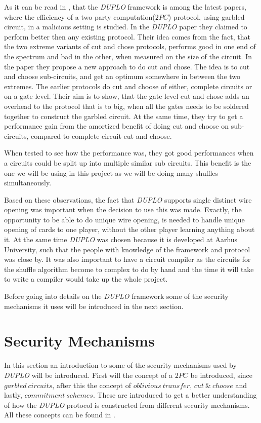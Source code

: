 \documentclass[twoside,11pt,openright]{report}
\newcommand{\DUPLO}{\textit{DUPLO} }
\begin{document}
As it can be read in \cite{duplo}, that the \DUPLO framework is among the latest papers, where the efficiency of a two party computation($2PC$) protocol, using garbled circuit, in a malicious setting is studied. In the \DUPLO paper they claimed to perform better then any existing protocol. Their idea comes from the fact, that the two extreme variants of cut and chose protocols, performs good in one end of the spectrum and bad in the other, when measured on the size of the circuit. In the paper they propose a new approach to do cut and chose. The idea is to cut and choose sub-circuits, and get an optimum somewhere in between the two extremes. The earlier protocols do cut and choose of either, complete circuits or on a gate level. Their aim is to show, that the gate level cut and chose adds an overhead to the protocol that is to big, when all the gates needs to be soldered together to construct the garbled circuit. At the same time, they try to get a performance gain from the amortized benefit of doing cut and choose on sub-circuits, compared to complete circuit cut and choose.

When tested to see how the performance was, they got good performances when a circuits could be split up into multiple similar sub circuits. This benefit is the one we will be using in this project as we will be doing many shuffles simultaneously.

\bigskip

Based on these observations, the fact that \DUPLO supports single distinct wire opening was important when the decision to use this was made. Exactly, the opportunity to be able to do unique wire opening, is needed to handle unique opening of cards to one player, without the other player learning anything about it. At the same time \DUPLO was chosen because it is developed at Aarhus University, such that the people with knowledge of the framework and protocol was close by. It was also important to have a circuit compiler as the circuits for the shuffle algorithm become to complex to do by hand and the time it will take to write a compiler would take up the whole project.

\bigskip

Before going into details on the \DUPLO framework some of the security mechanisms it uses will be introduced in the next section.

\section{Security Mechanisms}
In this section an introduction to some of the security mechanisms used by \DUPLO will be introduced. First will the concept of a $2PC$ be introduced, since $garbled~circuits$, after this the concept of $oblivious~transfer$, $cut~\&~choose$ and lastly, $commitment~schemes$. These are introduced to get a better understanding of how the \DUPLO protocol is constructed from different security mechanisms. All these concepts can be found in \cite{estpp}.
\end{document}
